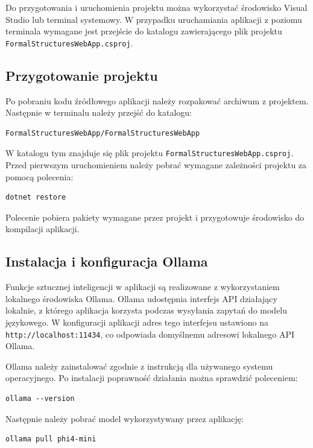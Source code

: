 \documentclass[12pt]{article}
\begin{document}
Do przygotowania i uruchomienia projektu można wykorzystać środowisko Visual Studio lub terminal systemowy. W przypadku uruchamiania aplikacji z poziomu terminala wymagane jest przejście do katalogu zawierającego plik projektu \texttt{FormalStructuresWebApp.csproj}.

\subsection{Przygotowanie projektu}

Po pobraniu kodu źródłowego aplikacji należy rozpakować archiwum z projektem. Następnie w terminalu należy przejść do katalogu:

\begin{verbatim}
FormalStructuresWebApp/FormalStructuresWebApp
\end{verbatim}

W katalogu tym znajduje się plik projektu \texttt{FormalStructuresWebApp.csproj}. Przed pierwszym uruchomieniem należy pobrać wymagane zależności projektu za pomocą polecenia:

\begin{verbatim}
dotnet restore
\end{verbatim}

Polecenie pobiera pakiety wymagane przez projekt i przygotowuje środowisko do kompilacji aplikacji.

\subsection{Instalacja i konfiguracja Ollama}

Funkcje sztucznej inteligencji w aplikacji są realizowane z wykorzystaniem lokalnego środowiska Ollama. Ollama udostępnia interfejs API działający lokalnie, z którego aplikacja korzysta podczas wysyłania zapytań do modelu językowego. W konfiguracji aplikacji adres tego interfejsu ustawiono na \texttt{http://localhost:11434}, co odpowiada domyślnemu adresowi lokalnego API Ollama.

Ollama należy zainstalować zgodnie z instrukcją dla używanego systemu operacyjnego. Po instalacji poprawność działania można sprawdzić poleceniem:

\begin{verbatim}
ollama --version
\end{verbatim}

Następnie należy pobrać model wykorzystywany przez aplikację:

\begin{verbatim}
ollama pull phi4-mini
\end{verbatim}
\end{document}
